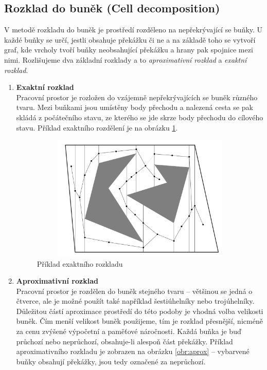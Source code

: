 \subsection{Rozklad do buněk (Cell decomposition)}
V metodě rozkladu do buněk je prostředí rozděleno na nepřekrývající se
buňky. U každé buňky se určí, jestli obsahuje překážku či ne a na základě toho se vytvoří graf, kde vrcholy tvoří buňky neobsahující překážku a hrany pak spojnice mezi nimi. Rozlišujeme dva základní rozklady a to \textit{aproximativní rozklad} a \textit{exaktní rozklad}.
	\begin{enumerate}
		\item \textbf{Exaktní rozklad}\\
		Pracovní prostor je rozložen do vzájemně nepřekrývajících se buněk různého tvaru. Mezi buňkami jsou umístěny body přechodu a nalezená cesta se pak skládá z počátečního stavu, ze kterého se jde skrze body přechodu do cílového stavu. Příklad exaktního rozdělení je na obrázku \ref{obr:exact}. \cite{LaValle2006}
		
		\begin{figure}[h!]
			\begin{center}
				\includegraphics*[width=15cm,height=6cm,keepaspectratio]{obr/exact}
			\end{center}
			\caption{Příklad exaktního rozkladu \cite{LaValle2006}}
			\label{obr:exact}
		\end{figure}
		
		\item \textbf{Aproximativní rozklad}\\
		Pracovní prostor je rozdělen do buněk stejného tvaru -- většinou se jedná o čtverce, ale je možné použít také například šestiúhelníky nebo trojúhelníky. Důležitou částí aproximace prostředí do této podoby je vhodná volba velikosti buněk. Čím menší velikost buněk použijeme, tím je rozklad přesnější, nicméně za cenu zvýšené výpočetní a paměťové náročnosti. Každá buňka je buď průchozí nebo neprůchozí, obsahuje-li alespoň část překážky. Příklad aproximativního rozkladu je zobrazen na obrázku \ref{obr:aprox} -- vybarvené buňky obsahují překážky, jsou tedy označené za neprůchozí. \cite{Abd Algfoor2015}
		

\end{enumerate}
